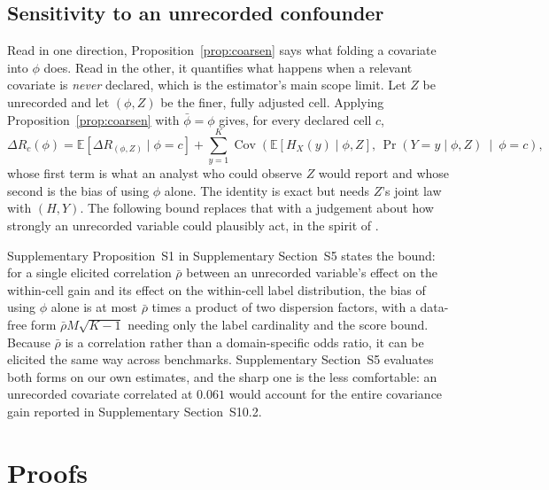 \documentclass[preprint,times,10pt,a4paper]{elsarticle}
\theoremstyle{plain}
\theoremstyle{definition}
\begin{document}
\subsection{Sensitivity to an unrecorded confounder}\label{sec:sensitivity}

Read in one direction, Proposition~\ref{prop:coarsen} says what folding a covariate into
$\phi$ does. Read in the other, it quantifies what happens when a relevant covariate is
\emph{never} declared, which is the estimator's main scope limit. Let $Z$ be unrecorded and
let $(\phi,Z)$ be the finer, fully adjusted cell. Applying
Proposition~\ref{prop:coarsen} with $\bar\phi=\phi$ gives, for every declared cell $c$,
\begin{equation}
\Delta R_c(\phi)=\mathbb E\!\left[\Delta R_{(\phi,Z)}\mid\phi=c\right]
+\sum_{y=1}^K\operatorname{Cov}\!\left(\mathbb E[H_X(y)\mid\phi,Z],\,
\Pr(Y=y\mid\phi,Z)\ \middle|\ \phi=c\right),
\label{eq:sensitivity-exact}
\end{equation}
whose first term is what an analyst who could observe $Z$ would report and whose second is
the bias of using $\phi$ alone. The identity is exact but needs $Z$'s joint law with
$(H,Y)$. The following bound replaces that with a judgement about how strongly an unrecorded
variable could plausibly act, in the spirit of \citet{rosenbaum2002observational}.

Supplementary Proposition~S1 in Supplementary Section~S5 states the bound: for a
single elicited correlation $\bar\rho$ between an unrecorded variable's effect on the
within-cell gain and its effect on the within-cell label distribution, the bias of using
$\phi$ alone is at most $\bar\rho$ times a product of two dispersion factors, with a
data-free form $\bar\rho M\sqrt{K-1}$ needing only the label cardinality and the score
bound. Because $\bar\rho$ is a correlation rather than a domain-specific odds ratio, it can
be elicited the same way across benchmarks. Supplementary Section~S5 evaluates both
forms on our own estimates, and the sharp one is the less comfortable: an unrecorded
covariate correlated at $0.061$ would account for the entire covariance gain reported in
Supplementary Section~S10.2.



\section{Proofs}\label{app:proofs}
\end{document}
